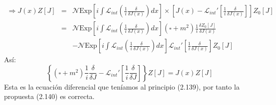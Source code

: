 \begin{eqnarray}
\nonumber \Rightarrow J(x)Z[J]&=&\mathcal{N}\text{Exp}\left[i\int\mathcal{L}_{int}\left(\frac{1}{i}\frac{\delta}{\delta J(x)}\right)dx\right]\times\left[J(x)-\mathcal{L}_{int}\prime\left[\frac{1}{i}\frac{\delta}{\delta J(x)}\right]\right]Z_{0}[J]\\
\nonumber &=&\mathcal{N}\text{Exp}\left[i\int\mathcal{L}_{int}\left(\frac{1}{i}\frac{\delta}{\delta J(x)}\right)dx\right](\square+m^{2})\frac{1}{i}\frac{\delta Z_{0}[J]}{\delta J(x)}\\
&&-\mathcal{N}\text{Exp}\left[i\int\mathcal{L}_{int}\left(\frac{1}{i}\frac{\delta}{\delta J(x)}\right)dx\right]\mathcal{L}_{int}\prime\left[\frac{1}{i}\frac{\delta}{\delta J(x)}\right]Z_{0}[J]
\end{eqnarray}
Así:
\begin{equation}
\left\{ (\square+m^{2})\frac{1}{i}\frac{\delta}{\delta J}-\mathcal{L}_{int}\prime\left[\frac{1}{i}\frac{\delta}{\delta J}\right]\right\} Z[J]=J(x)Z[J]
\end{equation}
Esta es la ecuación diferencial que teníamos al principio (2.139), por tanto la propuesta (2.140) es correcta.
\newpage


